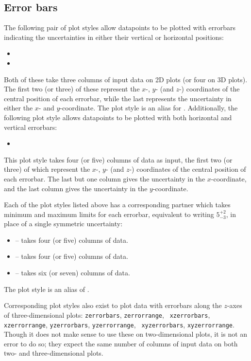\subsection{Error bars}
\label{sec:errorbars}

The following pair of plot styles allow datapoints to be plotted with errorbars
indicating the uncertainties in either their vertical or horizontal positions:
\begin{itemize}
\item {}
\item {}
\end{itemize}
Both of these take three columns of input data on 2D plots (or four on
3D plots). The first two (or three) of these represent the $x$-, $y$- (and
$z$-) coordinates of the central position of each errorbar, while the last
represents the uncertainty in either the $x$- and $y$-coordinate. The
plot style  is an alias for .
Additionally, the following plot style allows datapoints to be plotted with
both horizontal and vertical errorbars:
\begin{itemize}
\item {}
\end{itemize}
This plot style takes four (or five) columns of data as input, the first two
(or three) of which represent the $x$-, $y$- (and $z$-) coordinates of the
central position of each errorbar. The last but one column gives the
uncertainty in the $x$-coordinate, and the last column gives the uncertainty in
the $y$-coordinate.

Each of the plot styles listed above has a corresponding partner which takes
minimum and maximum limits for each errorbar, equivalent to writing
$5^{+2}_{-3}$, in place of a single symmetric uncertainty:
\begin{itemize}
\item {} -- takes four (or five) columns of data.
\item {} -- takes four (or five) columns of data.
\item {} -- takes six (or seven) columns of data.
\end{itemize}
The plot style  is an alias of .

Corresponding plot styles also exist to plot data with errorbars along the
$z$-axes of three-dimensional plots: {\tt zerrorbars}, {\tt zerrorrange}, {\tt
xzerrorbars}, {\tt xzerrorrange}, {\tt yzerrorbars}, {\tt yzerrorrange}, {\tt
xyzerrorbars}, {\tt xyzerrorrange}. Though it does not make sense to use these
on two-dimensional plots, it is not an error to do so; they expect the same
number of columns of input data on both two- and three-dimensional plots.

